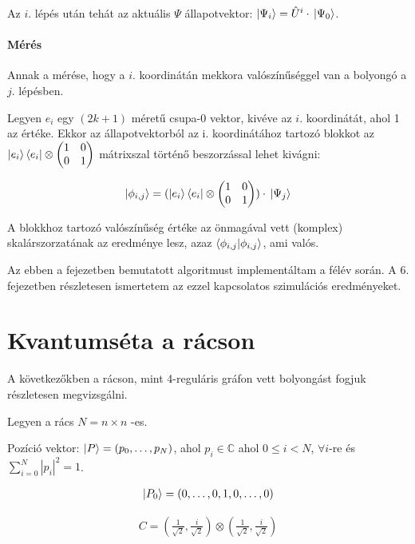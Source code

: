 Az $i.$ lépés után tehát az aktuális $\Psi$ állapotvektor: $\ket{\Psi_i} =
  {\hat{U}}^i\cdot{}\ket{\Psi_0}$.

\paragraph{Mérés}

Annak a mérése, hogy a $i.$ koordinátán mekkora valószínűséggel van a bolyongó
a $j.$ lépésben.

Legyen $e_i$ egy $(2k+1)$ méretű csupa-0 vektor, kivéve az $i.$ koordinátát,
ahol 1 az értéke. Ekkor az állapotvektorból az i. koordinátához tartozó blokkot
az $\ket{e_i}\bra{e_i} \otimes \begin{pmatrix} 1 & 0 \\ 0 & 1 \end{pmatrix}$
mátrixszal történő beszorzással lehet kivágni:

\begin{center} \[ \ket{\phi_{i,j}} =
    (\ket{e_i}\bra{e_i} \otimes
    \begin{pmatrix} 1 & 0 \\ 0 & 1 \end{pmatrix})
    \cdot{} \ket{\Psi_j} \]
\end{center}

A blokkhoz tartozó valószínűség értéke az önmagával vett
(komplex) skalárszorzatának az eredménye lesz, azaz $\braket{\phi_{i,j}}$, ami valós.

Az ebben a fejezetben bemutatott algoritmust implementáltam a félév során. A 6.
fejezetben részletesen ismertetem az ezzel kapcsolatos szimulációs
eredményeket.

\section{Kvantumséta a rácson}

A következőkben a rácson, mint 4-reguláris gráfon vett bolyongást fogjuk
részletesen megvizsgálni.

Legyen a rács $N = n \times n$ -es.

Pozíció vektor: $\ket{P} =  (p_{0}, \dots, p_{N})$, ahol
$p_{i}\in\mathds{C}$ ahol $0 \leq{} i < N$, $\forall{}i$-re és $\sum\limits_{i=0}^{N} |p_i|^2 = 1$.

\begin{align}
  \ket{P_{0}} =  (0, \dots, 0, 1, 0, \dots, 0)
\end{align}

\begin{align}
  C = (\frac{1}{\sqrt{2}}, \frac{i}{\sqrt{2}}) \otimes (\frac{1}{\sqrt{2}}, \frac{i}{\sqrt{2}})
\end{align}


